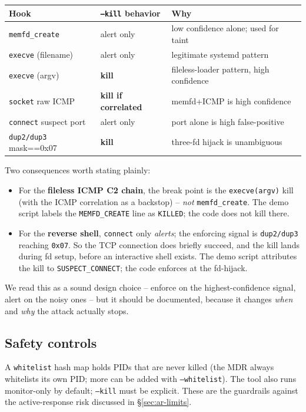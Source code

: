 \documentclass[11pt]{article}
\newcommand{\co}[1]{\texttt{#1}}
\begin{document}
\begin{center}
\begin{tabularx}{\linewidth}{@{}l l Y@{}}
\toprule
\textbf{Hook} & \textbf{\co{--kill} behavior} & \textbf{Why}\\
\midrule
\co{memfd\_create} & alert only & low confidence alone; used for taint\\
\co{execve} (filename) & alert only & legitimate systemd pattern\\
\co{execve} (argv) & \textbf{kill} & fileless-loader pattern, high confidence\\
\co{socket} raw ICMP & \textbf{kill if correlated} & memfd+ICMP is high confidence\\
\co{connect} suspect port & alert only & port alone is high false-positive\\
\co{dup2/dup3} mask==0x07 & \textbf{kill} & three-fd hijack is unambiguous\\
\bottomrule
\end{tabularx}
\end{center}

\noindent
Two consequences worth stating plainly:
\begin{itemize}[leftmargin=1.4em]
  \item For the \textbf{fileless ICMP C2 chain}, the break point is the
        \co{execve(argv)} kill (with the ICMP correlation as a backstop) --
        \emph{not} \co{memfd\_create}. The demo script labels the
        \co{MEMFD\_CREATE} line as \co{KILLED}; the code does not kill there.
  \item For the \textbf{reverse shell}, \co{connect} only \emph{alerts}; the
        enforcing signal is \co{dup2/dup3} reaching \co{0x07}. So the TCP
        connection does briefly succeed, and the kill lands during fd setup,
        before an interactive shell exists. The demo script attributes the
        kill to \co{SUSPECT\_CONNECT}; the code enforces at the fd-hijack.
\end{itemize}
We read this as a sound design choice -- enforce on the highest-confidence
signal, alert on the noisy ones -- but it should be documented, because it
changes \emph{when} and \emph{why} the attack actually stops.

\subsection{Safety controls}
A \co{whitelist} hash map holds PIDs that are never killed (the MDR always
whitelists its own PID; more can be added with \co{--whitelist}). The tool
also runs monitor-only by default; \co{--kill} must be explicit. These are
the guardrails against the active-response risk discussed in
\S\ref{sec:ar-limits}.
\end{document}
